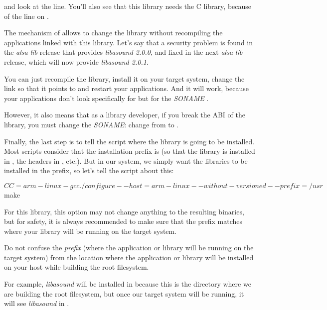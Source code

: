 and look at the  line. You'll also see that this
library needs the C library, because of the  line on
.

The mechanism of  allows to change the library without
recompiling the applications linked with this library. Let's say that
a security problem is found in the {\em alsa-lib} release that provides
{\em libasound 2.0.0}, and fixed in the next {\em alsa-lib} release, which will
now provide {\em libasound 2.0.1}.

You can just recompile the library, install it on your target system,
change the  link so that it points to
 and restart your applications. And it will
work, because your applications don't look specifically for
 but for the {\em SONAME}
.

However, it also means that as a library developer, if you break the
ABI of the library, you must change the {\em SONAME}: change from
 to .

Finally, the last step is to tell the  script where the
library is going to be installed. Most  scripts consider that
the installation prefix is  (so that the library is
installed in , the headers in
, etc.). But in our system, we simply want
the libraries to be installed in the  prefix, so let's tell
the  script about this:

\begin{bashinput}
$ CC=arm-linux-gcc ./configure --host=arm-linux  --without-versioned --prefix=/usr
$ make
\end{bashinput}

For this library, this option may not change anything to the resulting
binaries, but for safety, it is always recommended to make sure that
the prefix matches where your library will be running on the target
system.

Do not confuse the {\em prefix} (where the application or library will
be running on the target system) from the location where the
application or library will be installed on your host while building
the root filesystem.

For example, {\em libasound} will be installed in
 because this is
the directory where we are building the root filesystem, but once our
target system will be running, it will see {\em libasound} in
.

